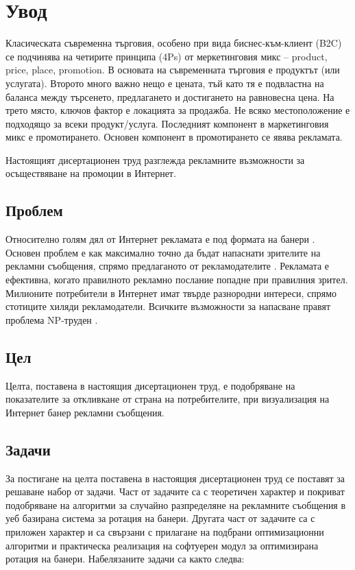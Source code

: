 \chapter*{Увод}

Класическата съвременна търговия, особено при вида биснес-към-клиент (B2C) се подчинява на четирите принципа (4Ps) от меркетинговия микс – product, price, place, promotion. В основата на съвременната търговия е продуктът (или услугата). Второто много важно нещо е цената, тъй като тя е подвластна на баланса между търсенето, предлагането и достигането на равновесна цена. На трето място, ключов фактор е локацията за продажба. Не всяко местоположение е подходящо за всеки продукт/услуга. Последният компонент в маркетинговия микс е промотирането. Основен компонент в промотирането се явява рекламата. 

Настоящият дисертационен труд разглежда рекламните възможности за осъществяване на промоции в Интернет. 

\section*{Проблем}

Относително голям дял от Интернет рекламата е под формата на банери \cite{1597398}. Основен проблем е как максимално точно да бъдат напаснати зрителите на рекламни съобщения, спрямо предлаганото от рекламодателите \cite{MIRALLESPECHUAN201839}. Рекламата е ефективна, когато правилното рекламно послание попадне при правилния зрител. Милионите потребители в Интернет имат твърде разнородни интереси, спрямо стотиците хиляди рекламодатели. Всичките възможности за напасване правят проблема NP-труден \cite{KIM2020106226}.

\section*{Цел}

Целта, поставена в настоящия дисертационен труд, е подобряване на показателите за откливкане от страна на потребителите, при визуализация на Интернет банер рекламни съобщения. 

\section*{Задачи}

За постигане на целта поставена в настоящия дисертационен труд се поставят за решаване набор от задачи. Част от задачите са с теоретичен характер и покриват подобряване на алгоритми за случайно разпределяне на рекламните съобщения в уеб базирана система за ротация на банери. Другата част от задачите са с приложен характер и са свързани с прилагане на подбрани оптимизационни алгоритми и практическа реализация на софтуерен модул за оптимизирана ротация на банери. Набелязаните задачи са както следва:

